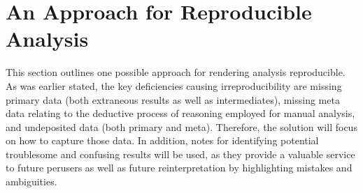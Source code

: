 \documentclass[a4paper]{report}
\begin{document}
\section{An Approach for Reproducible Analysis}
This section outlines one possible approach for rendering analysis reproducible.
As was earlier stated, the key deficiencies causing irreproducibility are 
missing primary data (both extraneous results as well as intermediates), 
missing meta data relating to the deductive process of reasoning employed 
for manual analysis, and undeposited data (both primary and meta).  Therefore, 
the solution will focus on how to capture those data.  In addition, notes for 
identifying potential troublesome and confusing results will be used, as they 
provide a valuable service to future perusers as well as future 
reinterpretation by highlighting mistakes and ambiguities.
\end{document}
